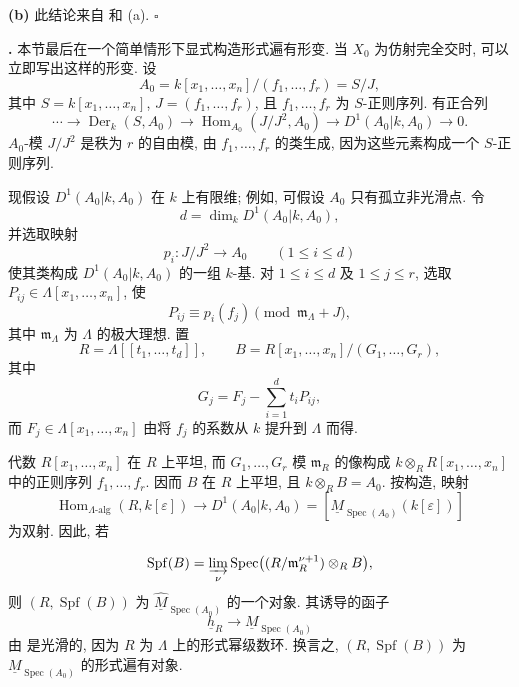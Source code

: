 
\noindent\textbf{(b)} 此结论来自  和 (a).
\hfill$\square$



\medskip
\noindent\textbf{.}
本节最后在一个简单情形下显式构造形式遍有形变. 当 $X_0$ 为仿射完全交时, 可以立即写出这样的形变. 设
\[
A_0=k[x_1,\ldots,x_n]/(f_1,\ldots,f_r)=S/J,
\]
其中 $S=k[x_1,\ldots,x_n]$, $J=(f_1,\ldots,f_r)$, 且 $f_1,\ldots,f_r$ 为 $S$-正则序列. 有正合列
\[
\cdots\longrightarrow\operatorname{Der}_k(S,A_0)
\longrightarrow\operatorname{Hom}_{A_0}(J/J^2,A_0)
\longrightarrow D^1(A_0|k,A_0)\longrightarrow0.
\]
$A_0$-模 $J/J^2$ 是秩为 $r$ 的自由模, 由 $f_1,\ldots,f_r$ 的类生成, 因为这些元素构成一个 $S$-正则序列.

现假设 $D^1(A_0|k,A_0)$ 在 $k$ 上有限维; 例如, 可假设 $A_0$ 只有孤立非光滑点. 令
\[
d=\dim_kD^1(A_0|k,A_0),
\]
并选取映射
\[
p_i:J/J^2\longrightarrow A_0\qquad(1\leq i\leq d)
\]
使其类构成 $D^1(A_0|k,A_0)$ 的一组 $k$-基. 对 $1\leq i\leq d$ 及 $1\leq j\leq r$, 选取 $P_{ij}\in\Lambda[x_1,\ldots,x_n]$, 使
\[
P_{ij}\equiv p_i(f_j)\pmod{\mathfrak m_\Lambda+J},
\]
其中 $\mathfrak m_\Lambda$ 为 $\Lambda$ 的极大理想. 置
\[
R=\Lambda[[t_1,\ldots,t_d]],
\qquad
B=R[x_1,\ldots,x_n]/(G_1,\ldots,G_r),
\]
其中
\[
G_j=F_j-\sum_{i=1}^d t_iP_{ij},
\]
而 $F_j\in\Lambda[x_1,\ldots,x_n]$ 由将 $f_j$ 的系数从 $k$ 提升到 $\Lambda$ 而得.

代数 $R[x_1,\ldots,x_n]$ 在 $R$ 上平坦, 而 $G_1,\ldots,G_r$ 模 $\mathfrak m_R$ 的像构成 $k\otimes_RR[x_1,\ldots,x_n]$ 中的正则序列 $f_1,\ldots,f_r$. 因而 $B$ 在 $R$ 上平坦, 且 $k\otimes_RB=A_0$. 按构造, 映射
\[
\operatorname{Hom}_{\Lambda\text{-alg}}(R,k[\varepsilon])
\longrightarrow D^1(A_0|k,A_0)
=[\underline M_{\operatorname{Spec}(A_0)}(k[\varepsilon])]
\]
为双射. 因此, 若


\[
\operatorname{Spf}(B)
=\varinjlim_\nu
\operatorname{Spec}\bigl((R/\mathfrak m_R^{\nu+1})\otimes_RB\bigr),
\]
则 $(R,\operatorname{Spf}(B))$ 为 $\widehat{\underline M}_{\operatorname{Spec}(A_0)}$ 的一个对象. 其诱导的函子
\[
\underline h_R\longrightarrow\underline M_{\operatorname{Spec}(A_0)}
\]
由  是光滑的, 因为 $R$ 为 $\Lambda$ 上的形式幂级数环. 换言之, $(R,\operatorname{Spf}(B))$ 为 $\underline M_{\operatorname{Spec}(A_0)}$ 的形式遍有对象.

